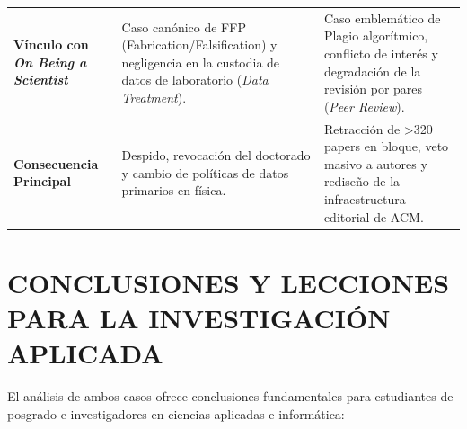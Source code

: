 \documentclass[12pt,a4paper]{article}
\let\oldsection\section
\renewcommand{\section}[1]{\needspace{5\baselineskip}\oldsection{#1}}
\begin{document}
\begin{table}[htbp]
\begin{tabularx}{\linewidth}{>{\hsize=0.7\hsize}X >{\hsize=1.15\hsize}X >{\hsize=1.15\hsize}X}
\textbf{Vínculo con }\textit{\textbf{On Being a Scientist}} & Caso canónico de FFP (Fabrication/Falsification) y negligencia en la custodia de datos de laboratorio (\textit{Data Treatment}). & Caso emblemático de Plagio algorítmico, conflicto de interés y degradación de la revisión por pares (\textit{Peer Review}). \\
\textbf{Consecuencia Principal} & Despido, revocación del doctorado y cambio de políticas de datos primarios en física. & Retracción de >320 papers en bloque, veto masivo a autores y rediseño de la infraestructura editorial de ACM. \\
\bottomrule
\end{tabularx}
\end{table}
\section{CONCLUSIONES Y LECCIONES PARA LA INVESTIGACIÓN APLICADA}
El análisis de ambos casos ofrece conclusiones fundamentales para estudiantes de posgrado e investigadores en ciencias aplicadas e informática:
\end{document}
